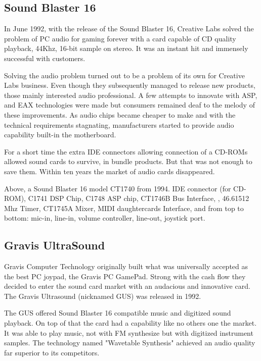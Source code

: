 \subsection{Sound Blaster 16}
 In June 1992, with the release of the Sound Blaster 16, Creative Labs solved the problem of PC audio for gaming forever with a card capable of CD quality playback, 44Khz, 16-bit sample on stereo. It was an instant hit and immensely successful with customers.\\
\par
{}
\par
Solving the audio problem turned out to be a problem of its own for Creative Labs business. Even though they subsequently managed to release new products, those mainly interested audio professional. A few attempts to innovate with ASP, and EAX technologies were made but consumers remained deaf to the melody of these improvements. As audio chips became cheaper to make and with the technical requirements stagnating, manufacturers started to provide audio capability built-in the motherboard.\\
\par
For a short time the extra IDE connectors allowing connection of a CD-ROMs allowed sound cards to survive, in bundle products. But that was not enough to save them. Within ten years the market of audio cards disappeared.\\
\par
{}
\par
Above, a Sound Blaster 16 model CT1740 from 1994.  IDE connector (for CD-ROM),  C1741 DSP Chip,  C1748 ASP chip,  CT1746B Bus Interface, , 46.61512 Mhz Timer,  CT1745A Mixer,  MIDI daughtercards Interface, and  from top to bottom: mic-in, line-in, volume controller, line-out, joystick port.







\subsection{Gravis UltraSound}
Gravis Computer Technology originally built what was universally accepted as the best PC joypad, the Gravis PC GamePad. Strong with the cash flow they decided to enter the sound card market with an audacious and innovative card. The Gravis Ultrasound (nicknamed GUS) was released in 1992.\\
\par
The GUS offered Sound Blaster 16 compatible music and digitized sound playback. On top of that the card had a capability like no others one the market. It was able to play music, not with FM synthesize but with digitized instrument samples. The technology named "Wavetable Synthesis" achieved an audio quality far superior to its competitors.


